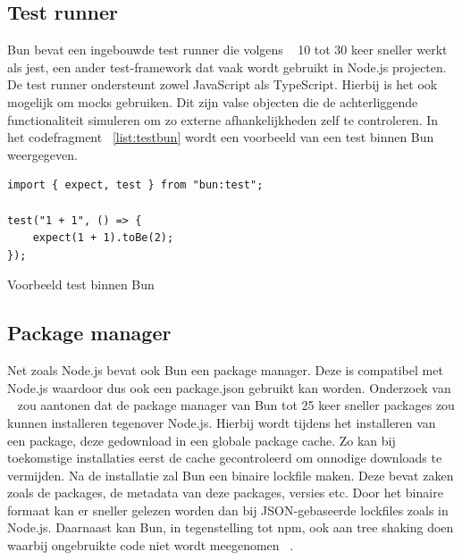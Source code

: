 \subsection{Test runner}
Bun bevat een ingebouwde test runner die volgens ~\textcite{McDonnel2023} 10 tot 30 keer sneller werkt als jest, een ander test-framework dat vaak wordt gebruikt in Node.js projecten.
De test runner ondersteunt zowel JavaScript als TypeScript. Hierbij is het ook mogelijk om mocks gebruiken.
Dit zijn valse objecten die de achterliggende functionaliteit simuleren om zo externe afhankelijkheden zelf te controleren.
In het codefragment ~\ref{list:testbun} wordt een voorbeeld van een test binnen Bun weergegeven.
\begin{listing}[H]
    \centering
    \begin{verbatim}
import { expect, test } from "bun:test";

test("1 + 1", () => {
    expect(1 + 1).toBe(2);
});
        \end{verbatim}
        \caption[Bun test]{\label{list:testbun}Voorbeeld test binnen Bun ~\autocite{McDonnel2023}}
\end{listing}

\subsection{Package manager}
Net zoals Node.js bevat ook Bun een package manager. 
Deze is compatibel met Node.js waardoor dus ook een package.json gebruikt kan worden.
Onderzoek van ~\textcite{McDonnel2023} zou aantonen dat de package manager 
van Bun tot 25 keer sneller packages zou kunnen installeren tegenover Node.js.
Hierbij wordt tijdens het installeren van een package, 
deze gedownload in een globale package cache. Zo kan bij toekomstige installaties 
eerst de cache gecontroleerd om onnodige downloads te vermijden. Na de installatie zal Bun een binaire lockfile maken. 
Deze bevat zaken zoals de packages, de metadata van deze packages, versies etc. Door het binaire formaat kan er sneller gelezen worden dan bij JSON-gebaseerde lockfiles zoals in Node.js.
Daarnaast kan Bun, in tegenstelling tot npm, ook aan tree shaking doen waarbij ongebruikte code niet wordt meegenomen ~\autocite{Aghdasi2023}.


